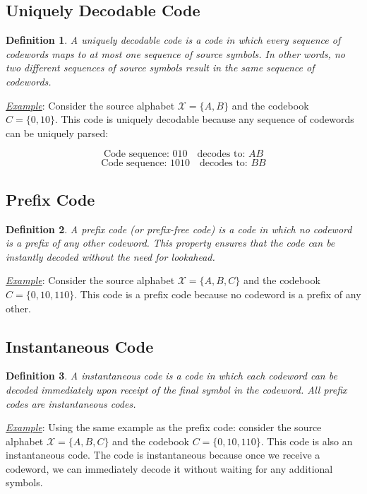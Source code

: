 \documentclass[a4paper,10pt]{article}
\newtheorem{definition}{Definition}[section] %
\newcommand{\hlt}[1]{\colorbox{color3}{#1}}
\begin{document}
\subsection{Uniquely Decodable Code}

\begin{definition}
    A \hlt{uniquely decodable code} is a code in which every sequence of codewords maps to at most one sequence of source symbols. In other words, no two different sequences of source symbols result in the same sequence of codewords.
\end{definition}

\noindent \underline{\textit{Example}}: Consider the source alphabet $\mathcal{X} = \{A, B\}$ and the codebook $C = \{0, 10\}$. This code is uniquely decodable because any sequence of codewords can be uniquely parsed:

$$
\text{Code sequence: } 010 \quad \text{decodes to: } AB
$$
$$
\text{Code sequence: } 1010 \quad \text{decodes to: } BB
$$

\subsection{Prefix Code}

\begin{definition}
    A \hlt{prefix code} (or prefix-free code) is a code in which no codeword is a prefix of any other codeword. This property ensures that the code can be instantly decoded without the need for lookahead.
\end{definition}

\noindent \underline{\textit{Example}}: Consider the source alphabet $\mathcal{X} = \{A, B, C\}$ and the codebook $C = \{0, 10, 110\}$. This code is a prefix code because no codeword is a prefix of any other.

\subsection{Instantaneous Code}

\begin{definition}
    A \hlt{instantaneous code} is a code in which each codeword can be decoded immediately upon receipt of the final symbol in the codeword. All prefix codes are instantaneous codes.
\end{definition}

\noindent \underline{\textit{Example}}: Using the same example as the prefix code: consider the source alphabet $\mathcal{X} = \{A, B, C\}$ and the codebook $C = \{0, 10, 110\}$. This code is also an instantaneous code. The code is instantaneous because once we receive a codeword, we can immediately decode it without waiting for any additional symbols.\\
\end{document}
